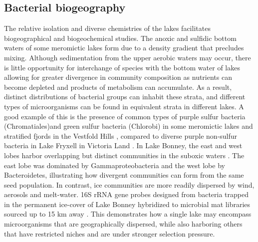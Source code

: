 \documentclass{book}
\begin{document}
\subsection{Bacterial biogeography}
The relative isolation and diverse chemistries of the lakes facilitates biogeographical and biogeochemical studies. 
The anoxic and sulfidic bottom waters of some meromictic lakes form due to a density gradient that precludes mixing. 
Although sedimentation from the upper aerobic waters may occur, 
there is little opportunity for interchange of species with the bottom water of lakes allowing for greater divergence in community composition as nutrients can become depleted 
and products of metabolism can accumulate.
As a result, distinct distributions of bacterial groups can inhabit these strata, and different types of microorganisms can be found in equivalent strata in different lakes. 
A good example of this is the presence of common types of purple sulfur bacteria (Chromatiales)and green sulfur bacteria (Chlorobi) 
in some meromictic lakes and stratified fjords in the Vestfold Hills \cite{Burke1988},
compared to diverse purple non-sulfur bacteria in Lake Fryxell in Victoria Land \cite{Karr2003}. 
In Lake Bonney, the east and west lobes harbor overlapping but distinct communities in the suboxic waters \cite{Glatz2006}.
The east lobe was dominated by Gammaproteobacteria and the west lobe by Bacteroidetes, illustrating how divergent communities can form from the same seed population. 
In contrast, ice communities are more readily dispersed by wind, aerosols and melt-water. 
16S rRNA gene probes designed from bacteria trapped in the permanent ice-cover of Lake Bonney hybridized to microbial mat libraries sourced up to 15 km away \cite{Gordon2000}.
This demonstrates how a single lake may encompass microorganisms that are geographically dispersed, while also harboring others that have restricted niches and are under stronger selection pressure.
\end{document}
